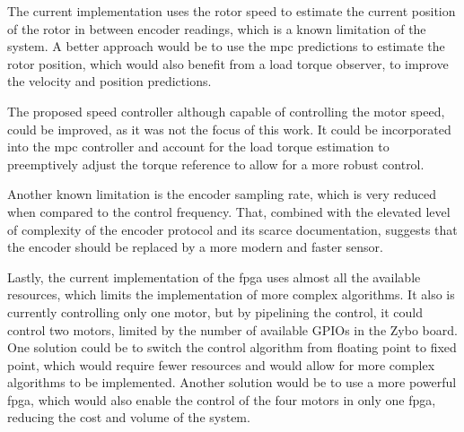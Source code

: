 The current implementation uses the rotor speed to estimate the current position of the rotor in between encoder readings, which is a known limitation of the system. A better approach would be to use the \gls{mpc} predictions to estimate the rotor position, which would also benefit from a load torque observer, to improve the velocity and position predictions.

The proposed speed controller although capable of controlling the motor speed, could be improved, as it was not the focus of this work. It could be incorporated into the \gls{mpc} controller and account for the load torque estimation to preemptively adjust the torque reference to allow for a more robust control.

Another known limitation is the encoder sampling rate, which is very reduced when compared to the control frequency. That, combined with the elevated level of complexity of the encoder protocol and its scarce documentation, suggests that the encoder should be replaced by a more modern and faster sensor.

Lastly, the current implementation of the \gls{fpga} uses almost all the available resources, which limits the implementation of more complex algorithms. It also is currently controlling only one motor, but by pipelining the control, it could control two motors, limited by the number of available GPIOs in the Zybo board. One solution could be to switch the control algorithm from floating point to fixed point, which would require fewer resources and would allow for more complex algorithms to be implemented. Another solution would be to use a more powerful \gls{fpga}, which would also enable the control of the four motors in only one \gls{fpga}, reducing the cost and volume of the system.